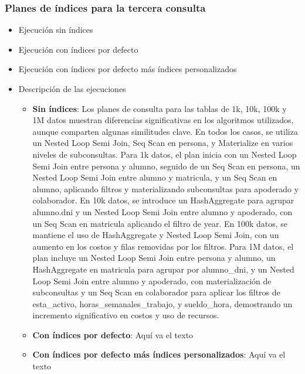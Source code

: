 \subsubsection{Planes de índices para la tercera consulta}
\begin{itemize}
	\item{Ejecución sin índices}
	\item{Ejecución con índices por defecto}
	\item{Ejecución con índices por defecto más índices personalizados}
      \item{Descripción de las ejecuciones}
      \begin{itemize}
            \item {\textbf{Sin índices}: Los planes de consulta para las tablas de 1k, 10k, 100k y 1M datos muestran diferencias significativas en los algoritmos utilizados, aunque comparten algunas similitudes clave. En todos los casos, se utiliza un Nested Loop Semi Join, Seq Scan en persona, y Materialize en varios niveles de subconsultas. Para 1k datos, el plan inicia con un Nested Loop Semi Join entre persona y alumno, seguido de un Seq Scan en persona, un Nested Loop Semi Join entre alumno y matricula, y un Seq Scan en alumno, aplicando filtros y materializando subconsultas para apoderado y colaborador. En 10k datos, se introduce un HashAggregate para agrupar alumno.dni y un Nested Loop Semi Join entre alumno y apoderado, con un Seq Scan en matricula aplicando el filtro de year. En 100k datos, se mantiene el uso de HashAggregate y Nested Loop Semi Join, con un aumento en los costos y filas removidas por los filtros. Para 1M datos, el plan incluye un Nested Loop Semi Join entre persona y alumno, un HashAggregate en matricula para agrupar por alumno\_dni, y un Nested Loop Semi Join entre alumno y apoderado, con materialización de subconsultas y un Seq Scan en colaborador para aplicar los filtros de esta\_activo, horas\_semanales\_trabajo, y sueldo\_hora, demostrando un incremento significativo en costos y uso de recursos.}
            \item {\textbf{Con índices por defecto}: Aquí va el texto}
            \item {\textbf{Con índices por defecto más índices personalizados}: Aquí va el texto}
      \end{itemize}
\end{itemize}
